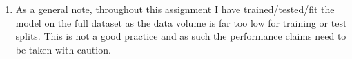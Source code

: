 \documentclass{scrreprt}
\begin{document}
\begin{enumerate}
\begin{enumerate}
\item As a general note, throughout this assignment I have trained/tested/fit the model on the full dataset as the data volume is far too low for training or test splits. This is not a good practice and as such the performance claims need to be taken with caution.
\end{enumerate}
%
%
%
%

\end{enumerate}
	
\end{document}
